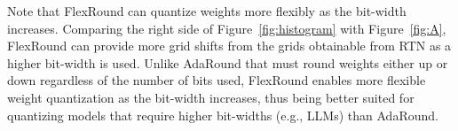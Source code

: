 \documentclass{article}
\theoremstyle{plain}
\theoremstyle{definition}
\theoremstyle{remark}
\begin{document}
Note that FlexRound can quantize weights more flexibly as the bit-width increases. Comparing the right side of Figure~\ref{fig:histogram} with Figure~\ref{fig:A}, FlexRound can provide more grid shifts from the grids obtainable from RTN as a higher bit-width is used. Unlike AdaRound that must round weights either up or down regardless of the number of bits used, FlexRound enables more flexible weight quantization as the bit-width increases, thus being better suited for quantizing models that require higher bit-widths (e.g., LLMs) than AdaRound. %





\end{document}
